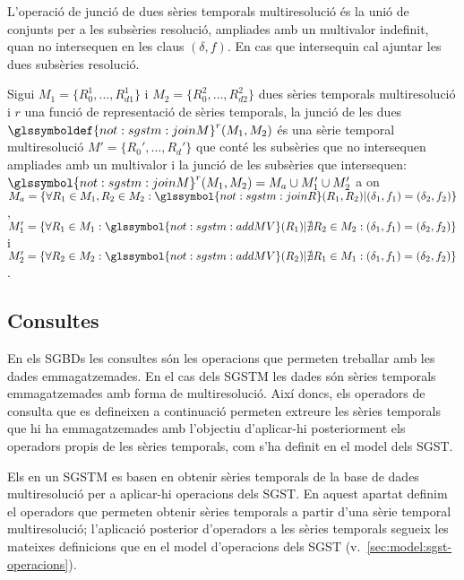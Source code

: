 L'operació de junció de dues sèries temporals multiresolució
és la unió de conjunts per a les subsèries resolució, ampliades amb un
multivalor indefinit, quan no intersequen en les claus $(\delta,f)$. En
cas que intersequin cal ajuntar les dues subsèries resolució.
\begin{definition}
  Sigui $M_1=\{R_0^1,\dotsc,R_{d1}^1\}$ i
  $M_2=\{R_0^2,\dotsc,R_{d2}^2\}$ dues sèries temporals multiresolució
  i $r$ una funció de representació de sèries temporals, la junció de
  les dues $\glssymboldef{not:sgstm:joinM}^r(M_1, M_2)$ és una sèrie
  temporal multiresolució $M'=\{R_0',\dotsc,R_d'\}$ que conté les
  subsèries que no intersequen ampliades amb un multivalor i la junció
  de les subsèries que intersequen:
  $\glssymbol{not:sgstm:joinM}^r(M_1, M_2)= M_{a} \cup M'_{1} \cup
  M'_{2}$ a on $M_a = \{\forall R_1\in M_1,R_2\in M_2:
  \glssymbol{not:sgstm:joinR}(R_1,R_2) | (\delta_1,f_1) =
  (\delta_2,f_2) \}$, $M_1' = \{\forall R_1\in M_1:
  \glssymbol{not:sgstm:addMV}(R_1)| \nexists R_2 \in M_2 :
  (\delta_1,f_1) = (\delta_2,f_2) \}$ i $M_2' = \{\forall R_2\in M_2:
  \glssymbol{not:sgstm:addMV}(R_2)| \nexists R_1 \in M_1 :
  (\delta_1,f_1) = (\delta_2,f_2) \}$.
\end{definition}





\subsection{Consultes}
\label{sec:sgstm:consultes}

En els \glspl{SGBD} les consultes són les
operacions que permeten treballar amb les dades emmagatzemades. En el
cas dels \gls{SGSTM} les dades són sèries temporals emmagatzemades amb forma
de multiresolució. Així doncs, els operadors de consulta que es
defineixen a continuació permeten extreure les sèries temporals que hi
ha emmagatzemades amb l'objectiu d’aplicar-hi posteriorment els
operadors propis de les sèries temporals, com s'ha definit en el model
dels \gls{SGST}.

Els  en un
\gls{SGSTM} es basen en obtenir sèries temporals de la base de dades
multiresolució per a aplicar-hi operacions dels \gls{SGST}.  En
aquest apartat definim el operadors que permeten obtenir sèries
temporals a partir d'una sèrie temporal multiresolució; l'aplicació
posterior d'operadors a les sèries temporals segueix les mateixes
definicions que en el model d'operacions dels \gls{SGST}
(v.~\autoref{sec:model:sgst-operacions}).


